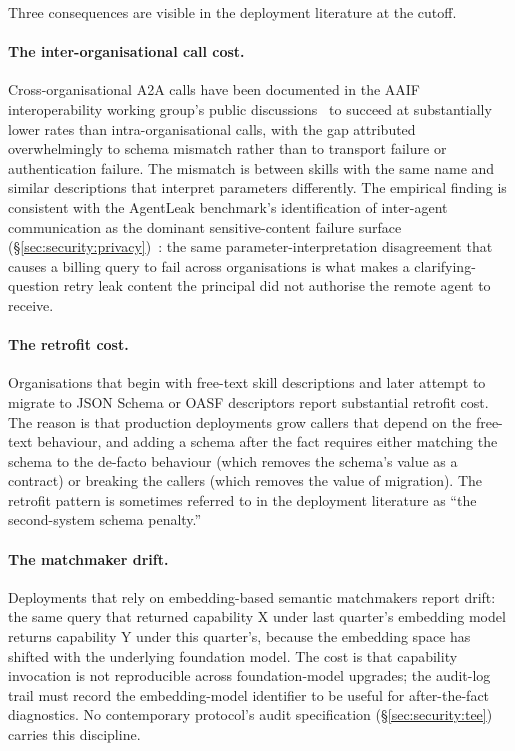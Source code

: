 Three consequences are visible in the
deployment literature at the cutoff.

\paragraph{The inter-organisational call cost.}
Cross-organisational A2A calls have been documented in the
AAIF interoperability working group's public
discussions~\cite{lf_aaif} to succeed at substantially
lower rates than intra-organisational calls, with the gap
attributed overwhelmingly to schema mismatch rather than to
transport failure or authentication failure. The mismatch is
between skills with the same name and similar descriptions
that interpret parameters differently. The empirical finding
is consistent with the AgentLeak benchmark's identification
of inter-agent communication as the dominant
sensitive-content failure surface
(\S\ref{sec:security:privacy})~\cite{agentleak}: the same
parameter-interpretation disagreement that causes a
billing query to fail across organisations is what makes a
clarifying-question retry leak content the principal did
not authorise the remote agent to receive.

\paragraph{The retrofit cost.}
Organisations that begin with free-text skill descriptions
and later attempt to migrate to JSON Schema or OASF
descriptors report substantial retrofit cost. The reason is
that production deployments grow callers that depend on
the free-text behaviour, and adding a schema after the
fact requires either matching the schema to the de-facto
behaviour (which removes the schema's value as a contract)
or breaking the callers (which removes the value of
migration). The retrofit pattern is sometimes referred to
in the deployment literature as ``the second-system schema
penalty.''

\paragraph{The matchmaker drift.}
Deployments that rely on embedding-based semantic
matchmakers report drift: the same query that returned
capability X under last quarter's embedding model returns
capability Y under this quarter's, because the embedding
space has shifted with the underlying foundation model.
The cost is that capability invocation is not
reproducible across foundation-model upgrades; the
audit-log trail must record the embedding-model
identifier to be useful for after-the-fact diagnostics.
No contemporary protocol's audit specification
(\S\ref{sec:security:tee}) carries this discipline.

